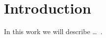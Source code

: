 \chapter{Introduction}
\thispagestyle{chapterBeginStyle}

In this work we will describe \ldots~\cite{Mierzejewski2015b}.
